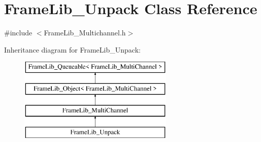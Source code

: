 \hypertarget{class_frame_lib___unpack}{}\section{Frame\+Lib\+\_\+\+Unpack Class Reference}
\label{class_frame_lib___unpack}


{\ttfamily \#include $<$Frame\+Lib\+\_\+\+Multichannel.\+h$>$}

Inheritance diagram for Frame\+Lib\+\_\+\+Unpack\+:\begin{figure}[H]
\begin{center}
\leavevmode
\includegraphics[height=4.000000cm]{class_frame_lib___unpack}
\end{center}
\end{figure}
